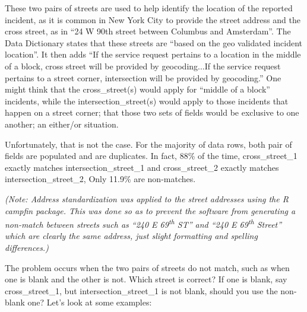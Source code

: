 \documentclass[12pt, titlepage]{article}
\begin{document}
{These two pairs of streets are used to help identify the location of the 
reported incident, as it is common in New York City to provide the 
street address and the cross street, as in ``24 W 90th street between 
Columbus and Amsterdam''. The Data Dictionary states that these 
streets are ``based on the geo validated incident location''. It then 
adds ``If the service request pertains to a location in the middle of a 
block, cross street will be provided by geocoding...If the service 
request pertains to a street corner, intersection will be provided by 
geocoding.''  One might think that the cross\_street(s) would apply 
for ``middle of a block'' incidents, while the intersection\_street(s) 
would apply to those incidents that happen on a street corner; 
that those two sets of fields would be exclusive to one another; 
an either/or situation. 

Unfortunately, that is not the case. For the majority of data rows, both 
pair of fields are populated and are duplicates. In fact, 88\% of the 
time, cross\_street\_1 exactly matches intersection\_street\_1 and 
cross\_street\_2 exactly matches intersection\_street\_2, Only 
11.9\% are non-matches.

\textit{(Note: Address standardization was applied to the street 
addresses using the R \emph{campfin} package. This was done so as 
to prevent the software from generating a non-match between 
streets such as ``240 E 69\textsuperscript{th} ST'' and ``240 E 
69\textsuperscript{th} Street'' which are clearly the same address, 
just slight formatting and spelling differences.)}

The problem occurs when the two pairs of streets do not match, such as 
when one is blank and the other is not. Which street is correct? If one 
is blank, say cross\_street\_1, but  intersection\_street\_1 is not blank, should 
you use the non-blank one?  Let's look at some examples:

}
\end{document}
